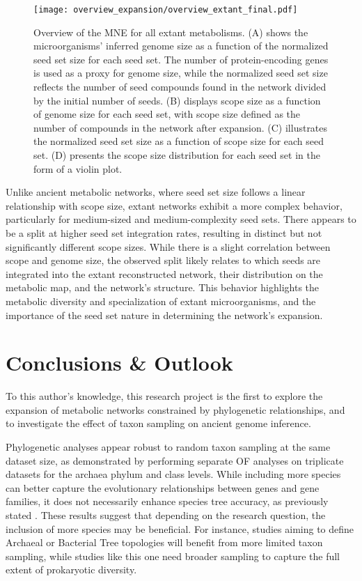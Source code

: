 \begin{figure}[htpb]
    \centering
    \texttt{[image: overview\_expansion/overview\_extant\_final.pdf]}
    \caption{Overview of the MNE for all extant metabolisms. (A) shows the microorganisms' inferred genome size as a function of the normalized seed set size for each seed set. The number of protein-encoding genes is used as a proxy for genome size, while the normalized seed set size reflects the number of seed compounds found in the network divided by the initial number of seeds. (B) displays scope size as a function of genome size for each seed set, with scope size defined as the number of compounds in the network after expansion. (C) illustrates the normalized seed set size as a function of scope size for each seed set. (D) presents the scope size distribution for each seed set in the form of a violin plot.}
    \label{overview_extant}
\end{figure}   

Unlike ancient metabolic networks, where seed set size follows a linear relationship with scope size, extant networks exhibit a more complex behavior, particularly for medium-sized and medium-complexity seed sets. There appears to be a split at higher seed set integration rates, resulting in distinct but not significantly different scope sizes. While there is a slight correlation between scope and genome size, the observed split likely relates to which seeds are integrated into the extant reconstructed network, their distribution on the metabolic map, and the network's structure. This behavior highlights the metabolic diversity and specialization of extant microorganisms, and the importance of the seed set nature in determining the network's expansion.


\section{Conclusions \& Outlook}
\normalsize

To this author's knowledge, this research project is the first to explore the expansion of metabolic networks constrained by phylogenetic relationships, and to investigate the effect of taxon sampling on ancient genome inference. 

Phylogenetic analyses appear robust to random taxon sampling at the same dataset size, as demonstrated by performing separate OF analyses on triplicate datasets for the archaea phylum and class levels. While including more species can better capture the evolutionary relationships between genes and gene families, it does not necessarily enhance species tree accuracy, as previously stated \cite{martinez-gutierrez2021}. These results suggest that depending on the research question, the inclusion of more species may be beneficial. For instance, studies aiming to define Archaeal or Bacterial Tree topologies will benefit from more limited taxon sampling, while studies like this one need broader sampling to capture the full extent of prokaryotic diversity. 

